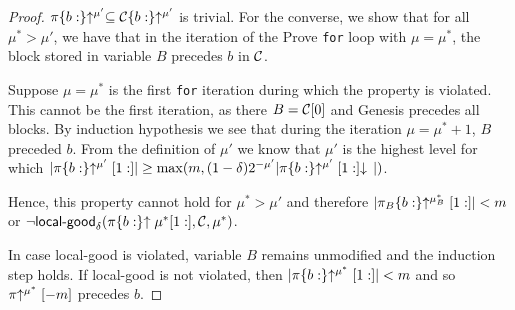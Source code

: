 \begin{proof}
    $\pi\{b:\}\negthickspace\uparrow^{\mu'} \subseteq \mathcal{C}\{b:\}\negthickspace\uparrow^{\mu'}$ is trivial.
    For the converse, we show that for all $\mu^* > \mu'$, we have that in
    the iteration of the Prove \texttt{for} loop with $\mu = \mu^*$, the block
    stored in variable $B$ precedes $b$ in $\mathcal{C}$.

    Suppose $\mu = \mu^*$ is the first \texttt{for} iteration during which the
    property is violated. This cannot be the first iteration, as there
    $B = \mathcal{C}[0]$ and Genesis precedes all blocks. By
    induction hypothesis we see that during the iteration $\mu = \mu^* + 1$,
    $B$ preceded $b$. From the definition of $\mu'$ we know
    that $\mu'$ is the highest level for which
    $|\pi\{b:\}\negthickspace\uparrow^{\mu'}[1:]|
    \geq \max(m, (1 -
    \delta)2^{-\mu'}|\pi\{b:\}\negthickspace\uparrow^{\mu'}[1:]\negthickspace\downarrow\,|)$.

    Hence, this
    property cannot hold for $\mu^* > \mu'$ and therefore
    $|\pi_B\{b:\}\negthickspace\uparrow^{\mu_B^*}[1:]| < m$ or $\lnot
    \textsf{local-good}_\delta(\pi\{b:\}\negthickspace\uparrow{\mu^*}[1:], \mathcal{C}, \mu^*)$.

    In case \textsf{local-good} is violated, variable $B$ remains unmodified and
    the induction step holds. If \textsf{local-good} is not violated, then
    $|\pi\{b:\}\negthickspace\uparrow^{\mu^*}[1:]| < m$ and so $\pi\negthickspace\uparrow^{\mu^*}[-m]$
    precedes $b$.
    \Qed
\end{proof}
